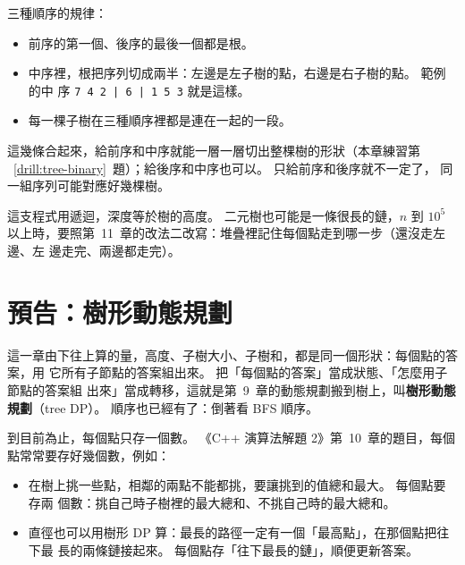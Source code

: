 \begin{center}
\label{fig:tree-binary}
\end{center}

三種順序的規律：

\begin{itemize}
\item 前序的第一個、後序的最後一個都是根。
\item 中序裡，根把序列切成兩半：左邊是左子樹的點，右邊是右子樹的點。 範例的中
序 \texttt{7 4 2 | 6 | 1 5 3} 就是這樣。
\item 每一棵子樹在三種順序裡都是連在一起的一段。
\end{itemize}

這幾條合起來，給前序和中序就能一層一層切出整棵樹的形狀（本章練習第
~\ref{drill:tree-binary}~題）；給後序和中序也可以。 只給前序和後序就不一定了，
同一組序列可能對應好幾棵樹。

這支程式用遞迴，深度等於樹的高度。 二元樹也可能是一條很長的鏈，$n$ 到 $10^5$
以上時，要照第~11~章的改法二改寫：堆疊裡記住每個點走到哪一步（還沒走左邊、左
邊走完、兩邊都走完）。

\section{預告：樹形動態規劃}
\label{sec:tree-dp-preview}

這一章由下往上算的量，高度、子樹大小、子樹和，都是同一個形狀：每個點的答案，用
它所有子節點的答案組出來。 把「每個點的答案」當成狀態、「怎麼用子節點的答案組
出來」當成轉移，這就是第~9~章的動態規劃搬到樹上，叫\textbf{樹形動態規劃}（tree
DP）。 順序也已經有了：倒著看 BFS 順序。

到目前為止，每個點只存一個數。 《C++ 演算法解題 2》第~10~章的題目，每個點常常要存好幾個數，例如：

\begin{itemize}
\item 在樹上挑一些點，相鄰的兩點不能都挑，要讓挑到的值總和最大。 每個點要存兩
個數：挑自己時子樹裡的最大總和、不挑自己時的最大總和。
\item 直徑也可以用樹形 DP 算：最長的路徑一定有一個「最高點」，在那個點把往下最
長的兩條鏈接起來。 每個點存「往下最長的鏈」，順便更新答案。
\end{itemize}


